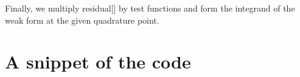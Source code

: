 \begin{DoxyCodeInclude}

\end{DoxyCodeInclude}


Finally, we multiply residual\mbox{[}\mbox{]} by test functions and form the integrand of the weak form at the given quadrature point.


\begin{DoxyCodeInclude}

\end{DoxyCodeInclude}


\section*{A snippet of the code }

 
\begin{DoxyCodeInclude}

\end{DoxyCodeInclude}
 